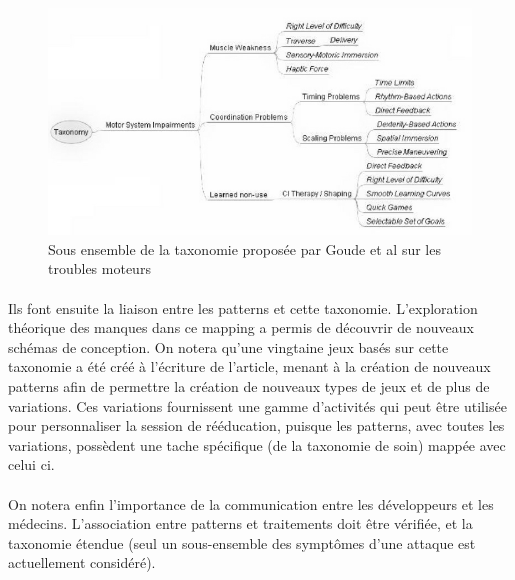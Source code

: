\begin{figure}
	\centering
	\includegraphics[width=15cm]{images/taxonomy_conception.png}
	\caption{Sous ensemble de la taxonomie proposée par Goude et al\cite{Goud07} sur les troubles moteurs}
	\label{taxonomy_conception}
\end{figure}

\paragraph{}Ils font ensuite la liaison entre les patterns et cette taxonomie. L'exploration théorique des manques dans ce mapping a permis de découvrir de nouveaux schémas de conception. On notera qu'une vingtaine jeux basés sur cette taxonomie a été créé à l'écriture de l'article, menant à la création de nouveaux patterns afin de permettre la création de nouveaux types de jeux et de plus de variations. Ces variations fournissent une gamme d'activités qui peut être utilisée pour personnaliser la session de rééducation, puisque les patterns, avec toutes les variations, possèdent une tache spécifique (de la taxonomie de soin) mappée avec celui ci.

\paragraph{}On notera enfin l'importance de la communication entre les développeurs et les médecins. L'association entre patterns et traitements doit être vérifiée, et la taxonomie étendue (seul un sous-ensemble des symptômes d'une attaque est actuellement considéré).

